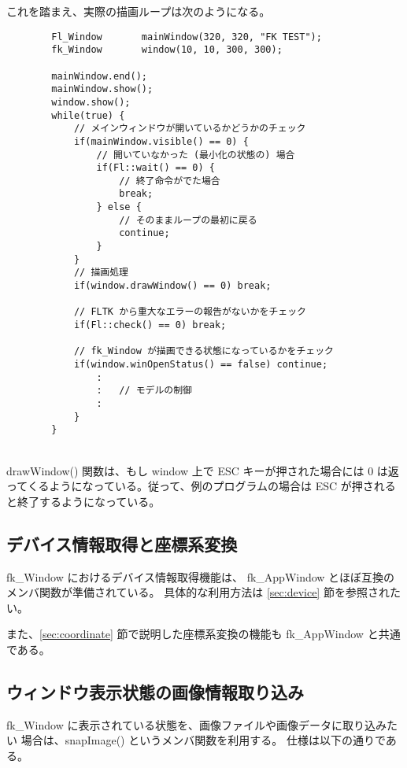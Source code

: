 これを踏まえ、実際の描画ループは次のようになる。
\\
\begin{breakbox}
\begin{verbatim}
        Fl_Window       mainWindow(320, 320, "FK TEST");
        fk_Window       window(10, 10, 300, 300);

        mainWindow.end();
        mainWindow.show();      
        window.show();
        while(true) {
            // メインウィンドウが開いているかどうかのチェック
            if(mainWindow.visible() == 0) {
                // 開いていなかった (最小化の状態の) 場合
                if(Fl::wait() == 0) {
                    // 終了命令がでた場合
                    break;
                } else {
                    // そのままループの最初に戻る
                    continue;
                }
            }
            // 描画処理
            if(window.drawWindow() == 0) break;

            // FLTK から重大なエラーの報告がないかをチェック
            if(Fl::check() == 0) break;

            // fk_Window が描画できる状態になっているかをチェック
            if(window.winOpenStatus() == false) continue;
                :
                :   // モデルの制御
                :
            }
        }
\end{verbatim}
\end{breakbox}
~ \\
drawWindow() 関数は、もし window 上で ESC キーが押された場合には
0 は返ってくるようになっている。従って、例のプログラムの場合は
ESC が押されると終了するようになっている。

\subsection{デバイス情報取得と座標系変換}
fk\_Window におけるデバイス情報取得機能は、
fk\_AppWindow とほぼ互換のメンバ関数が準備されている。
具体的な利用方法は \ref{sec:device} 節を参照されたい。

また、\ref{sec:coordinate} 節で説明した座標系変換の機能も
fk\_AppWindow と共通である。

\subsection{ウィンドウ表示状態の画像情報取り込み}
fk\_Window に表示されている状態を、画像ファイルや画像データに取り込みたい
場合は、snapImage() というメンバ関数を利用する。
仕様は以下の通りである。

